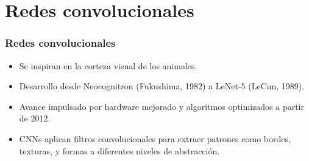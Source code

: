 \section{Redes convolucionales}


\begin{frame}
    \frametitle{Redes convolucionales}

    \begin{itemize}
        \item Se inspiran en la corteza visual de los animales.
        \item Desarrollo desde Neocognitron (Fukushima, 1982) a LeNet-5 (LeCun, 1989).
        \item Avance impulsado por hardware mejorado y algoritmos optimizados a partir de 2012.
        \item CNNs aplican filtros convolucionales para extraer patrones como bordes, texturas, y formas a diferentes niveles de abstracción.
    \end{itemize}

    
\end{frame}

\begin{frame}
\centering
\end{frame}


